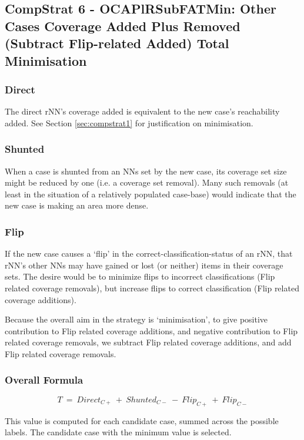 \documentclass[a4paper,11pt]{report}
\begin{document}
\subsection{CompStrat 6 - OCAPlRSubFATMin: Other Cases Coverage Added Plus Removed (Subtract Flip-related Added) Total Minimisation}

\subsubsection{Direct}

The direct rNN's coverage added is equivalent to the new case's reachability added. See Section \ref{sec:compstrat1} for justification on minimisation.

\subsubsection{Shunted}

When a case is shunted from an NNs set by the new case, its coverage set size might be reduced by one (i.e. a coverage set removal). Many such removals (at least in the situation of a relatively populated case-base) would indicate that the new case is making an area more dense.

\subsubsection{Flip}

If the new case causes a `flip' in the correct-classification-status of an rNN, that rNN's other NNs may have gained or lost (or neither) items in their coverage sets. The desire would be to minimize flips to incorrect classifications (Flip related coverage removals), but increase flips to correct classification (Flip related coverage additions).

Because the overall aim in the strategy is `minimisation', to give positive contribution to Flip related coverage additions, and negative contribution to Flip related coverage removals, we subtract Flip related coverage additions, and add Flip related coverage removals.

\subsubsection{Overall Formula}
\[  
  T~=~Direct_{C+}~+~Shunted_{C-}~-~Flip_{C+}~+~Flip_{C-}
\]

This value is computed for each candidate case, summed across the possible labels. The candidate case with the minimum value is selected.
\end{document}
